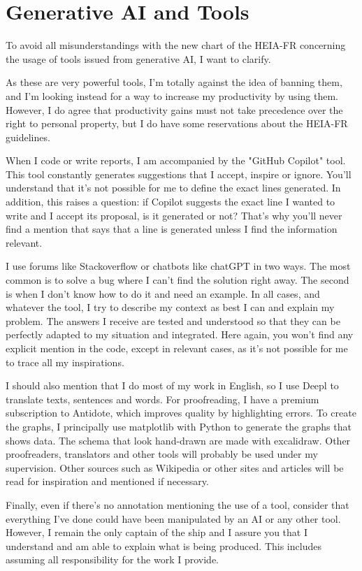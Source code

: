 \chapter{Generative AI and Tools}
\label{ch:tools}

To avoid all misunderstandings with the new chart of the HEIA-FR concerning the
usage of tools issued from generative AI, I want to clarify.

As these are very powerful tools, I'm totally against the idea of banning them,
and I'm looking instead for a way to increase my productivity by using them.
However, I do agree that productivity gains must not take precedence over the
right to personal property, but I do have some reservations about the HEIA-FR
guidelines.

When I code or write reports, I am accompanied by the "GitHub Copilot" tool.
This tool constantly generates suggestions that I accept, inspire or ignore.
You'll understand that it's not possible for me to define the exact lines
generated.
In addition, this raises a question: if Copilot suggests the exact line I wanted
to write and I accept its proposal, is it generated or not?
That's why you'll never find a mention that says that a line is generated unless
I find the information relevant.

I use forums like Stackoverflow or chatbots like chatGPT in two ways.
The most common is to solve a bug where I can't find the solution right away.
The second is when I don't know how to do it and need an example.
In all cases, and whatever the tool, I try to describe my context as best I can
and explain my problem.
The answers I receive are tested and understood so that they can be perfectly
adapted to my situation and integrated.
Here again, you won't find any explicit mention in the code, except in relevant
cases, as it's not possible for me to trace all my inspirations.

I should also mention that I do most of my work in English, so I use Deepl to
translate texts, sentences and words.
For proofreading, I have a premium subscription to Antidote, which improves
quality by highlighting errors.
To create the graphs, I principally use matplotlib with Python to generate the
graphs that shows data.
The schema that look hand-drawn are made with excalidraw.
Other proofreaders, translators and other tools will probably be used under my
supervision.
Other sources such as Wikipedia or other sites and articles will be read for
inspiration and mentioned if necessary.

Finally, even if there's no annotation mentioning the use of a tool, consider
that everything I've done could have been manipulated by an AI or any other tool.
However, I remain the only captain of the ship and I assure you that I
understand and am able to explain what is being produced.
This includes assuming all responsibility for the work I provide.

